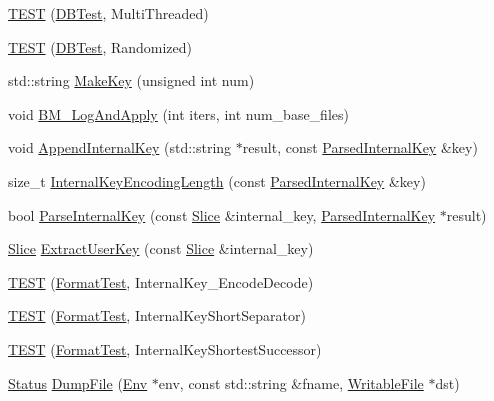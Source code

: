 \begin{DoxyCompactItemize}
\item 
\mbox{\hyperlink{namespaceleveldb_a9bee47c386abe6004d884f2552bd8184}{T\+E\+ST}} (\mbox{\hyperlink{classleveldb_1_1_d_b_test}{D\+B\+Test}}, Multi\+Threaded)
\item 
\mbox{\hyperlink{namespaceleveldb_a028ed215c12e1998d7073b18fce4c24c}{T\+E\+ST}} (\mbox{\hyperlink{classleveldb_1_1_d_b_test}{D\+B\+Test}}, Randomized)
\item 
std\+::string \mbox{\hyperlink{namespaceleveldb_a706c78e756ff2dcd2185cdf2265c0b8a}{Make\+Key}} (unsigned int num)
\item 
void \mbox{\hyperlink{namespaceleveldb_af9cf6ec167c9b6f25fd050ab6fb67a90}{B\+M\+\_\+\+Log\+And\+Apply}} (int iters, int num\+\_\+base\+\_\+files)
\item 
void \mbox{\hyperlink{namespaceleveldb_a7192bb79e7fa6ba01490473941386534}{Append\+Internal\+Key}} (std\+::string $\ast$result, const \mbox{\hyperlink{structleveldb_1_1_parsed_internal_key}{Parsed\+Internal\+Key}} \&key)
\item 
size\+\_\+t \mbox{\hyperlink{namespaceleveldb_a8406e76939e7e97465acf293f1585581}{Internal\+Key\+Encoding\+Length}} (const \mbox{\hyperlink{structleveldb_1_1_parsed_internal_key}{Parsed\+Internal\+Key}} \&key)
\item 
bool \mbox{\hyperlink{namespaceleveldb_a5a173b622e86c7a2f9beae3ac8818ac3}{Parse\+Internal\+Key}} (const \mbox{\hyperlink{classleveldb_1_1_slice}{Slice}} \&internal\+\_\+key, \mbox{\hyperlink{structleveldb_1_1_parsed_internal_key}{Parsed\+Internal\+Key}} $\ast$result)
\item 
\mbox{\hyperlink{classleveldb_1_1_slice}{Slice}} \mbox{\hyperlink{namespaceleveldb_a1c889869840312393b805ad91a41b94f}{Extract\+User\+Key}} (const \mbox{\hyperlink{classleveldb_1_1_slice}{Slice}} \&internal\+\_\+key)
\item 
\mbox{\hyperlink{namespaceleveldb_a0cb5db14747e016f18aa8684a485bc00}{T\+E\+ST}} (\mbox{\hyperlink{classleveldb_1_1_format_test}{Format\+Test}}, Internal\+Key\+\_\+\+Encode\+Decode)
\item 
\mbox{\hyperlink{namespaceleveldb_a88307bc8d4ac8ed2a4d1a530b24e255f}{T\+E\+ST}} (\mbox{\hyperlink{classleveldb_1_1_format_test}{Format\+Test}}, Internal\+Key\+Short\+Separator)
\item 
\mbox{\hyperlink{namespaceleveldb_abfb19a8fcd10a881d34dba3821434415}{T\+E\+ST}} (\mbox{\hyperlink{classleveldb_1_1_format_test}{Format\+Test}}, Internal\+Key\+Shortest\+Successor)
\item 
\mbox{\hyperlink{classleveldb_1_1_status}{Status}} \mbox{\hyperlink{namespaceleveldb_ad50cdd0c24cae7dc81faa1735725ddb9}{Dump\+File}} (\mbox{\hyperlink{classleveldb_1_1_env}{Env}} $\ast$env, const std\+::string \&fname, \mbox{\hyperlink{classleveldb_1_1_writable_file}{Writable\+File}} $\ast$dst)

\end{DoxyCompactItemize}

